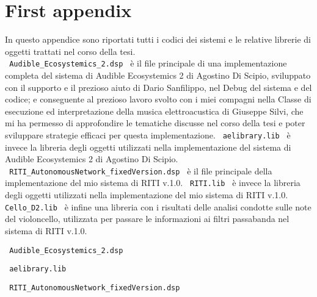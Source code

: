 \section{First appendix}

In questo appendice sono riportati tutti i codici dei sistemi
e le relative librerie di oggetti trattati nel corso della tesi. \\
\verb| Audible_Ecosystemics_2.dsp | è il file principale di una implementazione 
completa del sistema di Audible Ecosystemics 2 di Agostino Di Scipio, sviluppato con il supporto
e il prezioso aiuto di Dario Sanfilippo, nel Debug del sistema e del codice; 
e conseguente al prezioso lavoro svolto con i miei compagni nella Classe di esecuzione ed interpretazione 
della musica elettroacustica di Giuseppe Silvi, che mi ha permesso di approfondire le tematiche
discusse nel corso della tesi e poter sviluppare strategie efficaci per questa implementazione.
\verb| aelibrary.lib | è invece la libreria degli oggetti utilizzati nella implementazione del sistema
di Audible Ecosystemics 2 di Agostino Di Scipio. \\
\verb| RITI_AutonomousNetwork_fixedVersion.dsp | è il file principale della implementazione 
del mio sistema di RITI v.1.0. \verb| RITI.lib | è invece la libreria degli oggetti utilizzati nella 
implementazione del mio sistema di RITI v.1.0. \verb| Cello_D2.lib | è infine una libreria
con i risultati delle analisi condotte sulle note del violoncello, utilizzata per passare le informazioni
ai filtri passabanda nel sistema di RITI v.1.0. \\
\clearpage


\begin{center} \Large \verb| Audible_Ecosystemics_2.dsp | \normalsize \\
    \vspace{0.2cm} \end{center}

\clearpage

\begin{center} \Large \verb| aelibrary.lib | \normalsize \\
    \vspace{0.2cm} \end{center}

\clearpage

\begin{center} \Large \verb| RITI_AutonomousNetwork_fixedVersion.dsp | \normalsize \\
    \vspace{0.2cm} \end{center}

\clearpage

